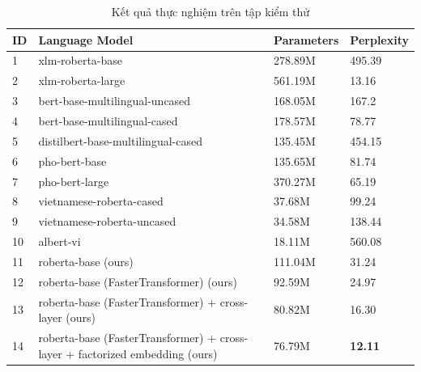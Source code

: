 \documentclass[10pt, conference, a4paper, compsocconf]{IEEEtran}
\begin{document}
\begin{table}
  \centering
  \begin{tabular}{|l|l|l|l|}
  \hline
  \textbf{ID} & \textbf{Language Model}                                                       & \textbf{Parameters} & \textbf{Perplexity} \\ \hline
  1           & xlm-roberta-base                                                              & 278.89M             & 495.39              \\ \hline
  2           & xlm-roberta-large                                                             & 561.19M             & 13.16               \\ \hline
  3           & bert-base-multilingual-uncased                                                & 168.05M             & 167.2               \\ \hline
  4           & bert-base-multilingual-cased                                                  & 178.57M             & 78.77               \\ \hline
  5           & distilbert-base-multilingual-cased                                            & 135.45M             & 454.15              \\ \hline
  6           & pho-bert-base                                                                 & 135.65M             & 81.74               \\ \hline
  7           & pho-bert-large                                                                & 370.27M             & 65.19               \\ \hline
  8           & vietnamese-roberta-cased                                                      & 37.68M              & 99.24               \\ \hline
  9           & vietnamese-roberta-uncased                                                    & 34.58M              & 138.44              \\ \hline
  10          & albert-vi                                                                     & 18.11M              & 560.08              \\ \hline
  11          & roberta-base (ours)                                                           & 111.04M             & 31.24               \\ \hline
  12          & roberta-base (FasterTransformer) (ours)                                       & 92.59M              & 24.97               \\ \hline
  13          & roberta-base (FasterTransformer) + cross-layer (ours)                         & 80.82M              & 16.30               \\ \hline
  14          & roberta-base (FasterTransformer) + cross-layer  + factorized embedding (ours) & 76.79M              & \textbf{12.11}      \\ \hline
  \end{tabular}
  \caption{Kết quả thực nghiệm trên tập kiểm thử}
  \label{Bảng:1}
  \end{table}
\end{document}
